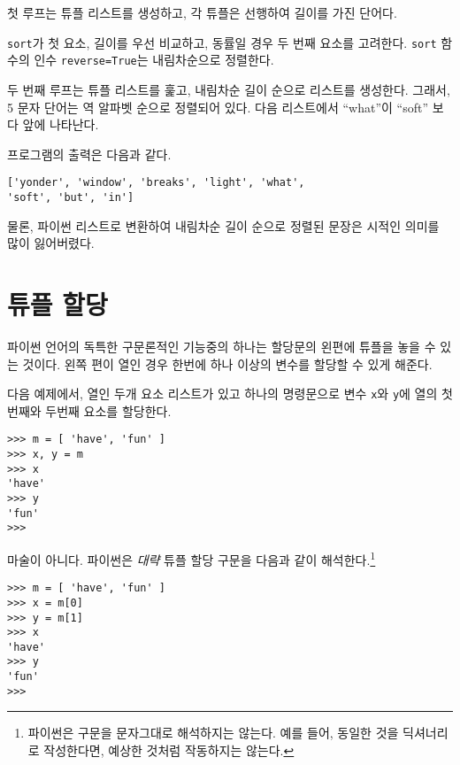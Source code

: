 첫 루프는 튜플 리스트를 생성하고, 각 튜플은 선행하여 길이를 가진 단어다.

{\tt sort}가 첫 요소, 길이를 우선 비교하고, 동률일 경우 두 번째 요소를 고려한다.
{\tt sort} 함수의 인수 {\tt reverse=True}는 내림차순으로 정렬한다.


두 번째 루프는 튜플 리스트를 훑고, 내림차순 길이 순으로 리스트를 생성한다.
그래서, 5 문자 단어는 역 알파벳 순으로 정렬되어 있다. 다음 리스트에서 ``what''이 
``soft'' 보다 앞에 나타난다.

프로그램의 출력은 다음과 같다.

%
\beforeverb
\begin{verbatim}
['yonder', 'window', 'breaks', 'light', 'what', 
'soft', 'but', 'in']
\end{verbatim}
\afterverb
%

물론, 파이썬 리스트로 변환하여 내림차순 길이 순으로 정렬된 문장은 시적인 의미를 많이 잃어버렸다.

\section{ 튜플 할당}
\label{tuple assignment}


파이썬 언어의 독특한 구문론적인 기능중의 하나는 할당문의 왼편에 튜플을 놓을 수 있는 것이다. 
왼쪽 편이 열인 경우 한번에 하나 이상의 변수를 할당할 수 있게 해준다.

다음 예제에서, 열인 두개 요소 리스트가 있고 하나의 명령문으로 변수 {\tt x}와 {\tt y}에 열의 첫번째와 두번째 요소를 할당한다. 

\beforeverb
\begin{verbatim}
>>> m = [ 'have', 'fun' ]
>>> x, y = m
>>> x
'have'
>>> y
'fun'
>>> 
\end{verbatim}
\afterverb
%

마술이 아니다. 파이썬은 \emph{대략} 튜플 할당 구문을 다음과 같이 해석한다.\footnote{파이썬은 구문을 문자그대로 해석하지는 않는다.
예를 들어, 동일한 것을 딕셔너리로 작성한다면, 예상한 것처럼 작동하지는 않는다.}

\beforeverb
\begin{verbatim}
>>> m = [ 'have', 'fun' ]
>>> x = m[0]
>>> y = m[1]
>>> x
'have'
>>> y
'fun'
>>> 
\end{verbatim}
\afterverb

